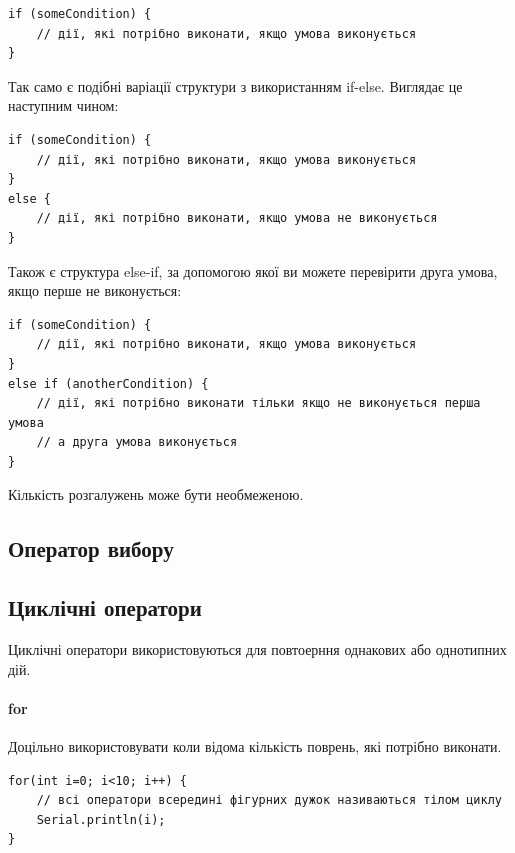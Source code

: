 \documentclass[12pt,a4paper]{report}  %
\begin{document}
\begin{lstlisting}[label=conditionoperator,caption=Умовний оператор (неповна форма)]
if (someCondition) {
	// дії, які потрібно виконати, якщо умова виконується
}
\end{lstlisting}

Так само є подібні варіації структури з використанням if-else. Виглядає це наступним чином:

\begin{lstlisting}[label=conditionoperator,caption=Умовний оператор (повна форма)]
if (someCondition) {
	// дії, які потрібно виконати, якщо умова виконується
}
else {
	// дії, які потрібно виконати, якщо умова не виконується
}
\end{lstlisting}

Також є структура else-if, за допомогою якої ви можете перевірити друга умова, якщо перше не виконується:

\begin{lstlisting}[label=conditionoperator,caption=Умовний оператор (декільки умов)]
if (someCondition) {
	// дії, які потрібно виконати, якщо умова виконується
} 
else if (anotherCondition) {
	// дії, які потрібно виконати тільки якщо не виконується перша умова
	// а друга умова виконується
}
\end{lstlisting}

Кількість розгалужень може бути необмеженою.

\subsection{Оператор вибору}


\subsection{Циклічні оператори}
Циклічні оператори використовуються для повтоерння однакових або однотипних дій.

\paragraph{for}

Доцільно використовувати коли відома кількість поврень, які потрібно виконати.

\begin{lstlisting}[label=conditionoperator,caption=Оператор повторення for]
for(int i=0; i<10; i++) {
	// всі оператори всередині фігурних дужок називаються тілом циклу
	Serial.println(i);
}
\end{lstlisting}
\end{document}
